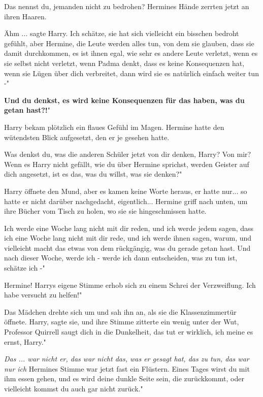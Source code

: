 \glqq Das nennst du, jemanden nicht zu bedrohen?\grqq{} Hermines Hände zerrten
jetzt an ihren Haaren.

\glqq Ähm ...\grqq{} sagte Harry. \glqq Ich schätze, sie hat sich vielleicht ein
bisschen bedroht gefühlt, aber Hermine, die Leute werden alles tun, von dem sie
glauben, dass sie damit durchkommen, es ist ihnen egal, wie sehr es andere Leute
verletzt, wenn es sie selbst nicht verletzt, wenn Padma denkt, dass es keine
Konsequenzen hat, wenn sie Lügen über dich verbreitet, dann wird sie es
natürlich einfach weiter tun -"

\glqq \textbf{Und du denkst, es wird keine Konsequenzen für das haben, was du
getan hast?!}"

Harry bekam plötzlich ein flaues Gefühl im Magen. Hermine hatte den wütendsten
Blick aufgesetzt, den er je gesehen hatte.

\glqq Was denkst du, was die anderen Schüler jetzt von dir denken, Harry? Von
mir? Wenn es Harry nicht gefällt, wie du über Hermine sprichst, werden Geister
auf dich angesetzt, ist es das, was du willst, was sie denken?"

Harry öffnete den Mund, aber es kamen keine Worte heraus, er hatte nur... so
hatte er nicht darüber nachgedacht, eigentlich... Hermine griff nach unten, um
ihre Bücher vom Tisch zu holen, wo sie sie hingeschmissen hatte.

\glqq Ich werde eine Woche lang nicht mit dir reden, und ich werde jedem sagen,
dass ich eine Woche lang nicht mit dir rede, und ich werde ihnen sagen, warum,
und vielleicht macht das etwas von dem rückgängig, was du gerade getan hast. Und
nach dieser Woche, werde ich - werde ich dann entscheiden, was zu tun ist,
schätze ich -"

\glqq Hermine!\grqq{} Harrys eigene Stimme erhob sich zu einem Schrei der
Verzweiflung. \glqq Ich habe versucht zu helfen!"

Das Mädchen drehte sich um und sah ihn an, als sie die Klassenzimmertür öffnete.
\glqq Harry\grqq{}, sagte sie, und ihre Stimme zitterte ein wenig unter der Wut,
\glqq Professor Quirrell saugt dich in die Dunkelheit, das tut er wirklich, ich
meine es ernst, Harry."

\emph{Das ... war nicht er, das war nicht das, was er gesagt hat, das zu tun,
das war nur ich}
Hermines Stimme war jetzt fast ein Flüstern. \glqq Eines Tages wirst du mit ihm
essen gehen, und es wird deine dunkle Seite sein, die zurückkommt, oder
vielleicht kommst du auch gar nicht zurück."

